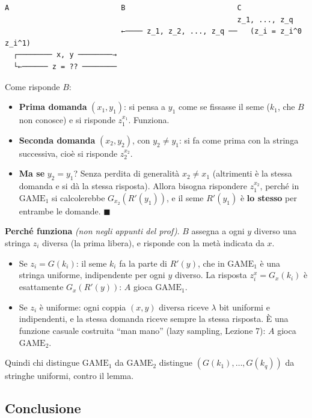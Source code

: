 \begin{verbatim}
A                          B                          C
                                                      z_1, ..., z_q
                           ←──── z_1, z_2, ..., z_q ──   (z_i = z_i^0 z_i^1)
  ┌──────── x, y ────────→
  └←────── z = ?? ────────
\end{verbatim}

Come risponde \(B\):
\begin{itemize}
  \item \textbf{Prima domanda} \((x_1, y_1)\): si pensa a \(y_1\) come se fissasse il seme (\(k_1\), che \(B\) non conosce) e si risponde \(z_1^{x_1}\). Funziona.
  \item \textbf{Seconda domanda} \((x_2, y_2)\), con \(y_2 \ne y_1\): si fa come prima con la stringa successiva, cioè si risponde \(z_2^{x_2}\).
  \item \textbf{Ma se} \(y_2 = y_1\)? Senza perdita di generalità \(x_2 \ne x_1\) (altrimenti è la stessa domanda e si dà la stessa risposta). Allora bisogna rispondere \(z_1^{x_2}\), perché in \(\text{GAME}_1\) si calcolerebbe \(G_{x_2}(R'(y_1))\), e il seme \(R'(y_1)\) è \textbf{lo stesso} per entrambe le domande. \(\blacksquare\)
\end{itemize}

\begin{nota}
\textbf{Perché funziona} \emph{(non negli appunti del prof)}. \(B\) assegna a ogni \(y\) diverso una stringa \(z_i\) diversa (la prima libera), e risponde con la metà indicata da \(x\).
\begin{itemize}
  \item Se \(z_i = G(k_i)\): il seme \(k_i\) fa la parte di \(R'(y)\), che in \(\text{GAME}_1\) è una stringa uniforme, indipendente per ogni \(y\) diverso. La risposta \(z_i^{x} = G_x(k_i)\) è esattamente \(G_x(R'(y))\): \(A\) gioca \(\text{GAME}_1\).
  \item Se \(z_i\) è uniforme: ogni coppia \((x, y)\) diversa riceve \(\lambda\) bit uniformi e indipendenti, e la stessa domanda riceve sempre la stessa risposta. È una funzione casuale costruita ``man mano'' (lazy sampling, Lezione 7): \(A\) gioca \(\text{GAME}_2\).
\end{itemize}
Quindi chi distingue \(\text{GAME}_1\) da \(\text{GAME}_2\) distingue \((G(k_1), \dots, G(k_q))\) da stringhe uniformi, contro il lemma.
\end{nota}

\subsection{Conclusione}

